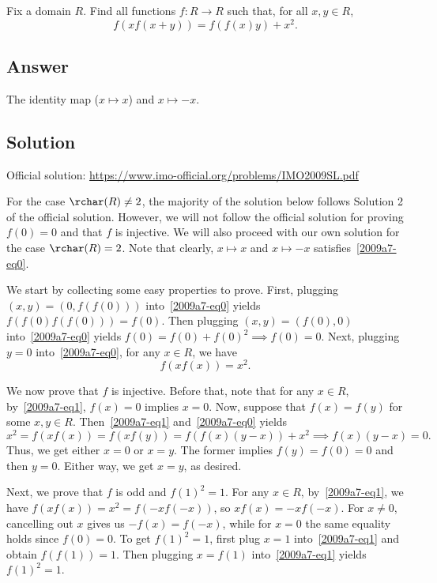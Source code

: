 Fix a domain $R$.
Find all functions $f : R \to R$ such that, for all $x, y \in R$,
\[ f(x f(x + y)) = f(f(x) y) + x^2. \tag{*}\label{2009a7-eq0} \]



\subsection*{Answer}

The identity map ($x \mapsto x$) and $x \mapsto -x$.



\subsection*{Solution}

Official solution: \url{https://www.imo-official.org/problems/IMO2009SL.pdf}

For the case $\rchar(R) \neq 2$, the majority of the solution below follows Solution 2 of the official solution.
However, we will not follow the official solution for proving $f(0) = 0$ and that $f$ is injective.
We will also proceed with our own solution for the case $\rchar(R) = 2$.
Note that clearly, $x \mapsto x$ and $x \mapsto -x$ satisfies~\eqref{2009a7-eq0}.

We start by collecting some easy properties to prove.
First, plugging $(x, y) = (0, f(f(0)))$ into~\eqref{2009a7-eq0} yields $f(f(0) f(f(0))) = f(0)$.
Then plugging $(x, y) = (f(0), 0)$ into~\eqref{2009a7-eq0} yields $f(0) = f(0) + f(0)^2 \implies f(0) = 0$.
Next, plugging $y = 0$ into~\eqref{2009a7-eq0}, for any $x \in R$, we have
\[ f(x f(x)) = x^2. \tag{1}\label{2009a7-eq1} \]

We now prove that $f$ is injective.
Before that, note that for any $x \in R$, by~\eqref{2009a7-eq1}, $f(x) = 0$ implies $x = 0$.
Now, suppose that $f(x) = f(y)$ for some $x, y \in R$.
Then~\eqref{2009a7-eq1} and~\eqref{2009a7-eq0} yields
\[ x^2 = f(x f(x)) = f(x f(y)) = f(f(x) (y - x)) + x^2 \implies f(x) (y - x) = 0. \]
Thus, we get either $x = 0$ or $x = y$.
The former implies $f(y) = f(0) = 0$ and then $y = 0$.
Either way, we get $x = y$, as desired.

Next, we prove that $f$ is odd and $f(1)^2 = 1$.
For any $x \in R$, by~\eqref{2009a7-eq1}, we have $f(x f(x)) = x^2 = f(-x f(-x))$, so $x f(x) = -x f(-x)$.
For $x \neq 0$, cancelling out $x$ gives us $-f(x) = f(-x)$, while for $x = 0$ the same equality holds since $f(0) = 0$.
To get $f(1)^2 = 1$, first plug $x = 1$ into~\eqref{2009a7-eq1} and obtain $f(f(1)) = 1$.
Then plugging $x = f(1)$ into~\eqref{2009a7-eq1} yields $f(1)^2 = 1$.



